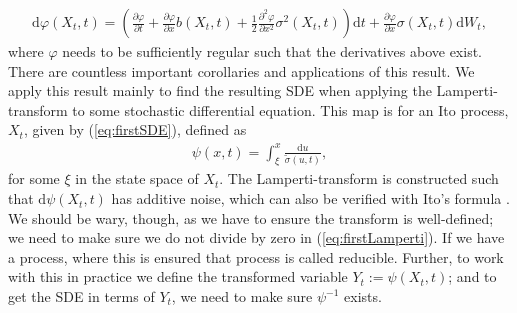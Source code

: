 \begin{align}
    \mathrm{d}\varphi(X_t, t) = \left(\frac{\partial \varphi}{\partial t} + \frac{\partial\varphi}{\partial x}b(X_t, t) + \frac{1}{2} \frac{\partial^2 \varphi}{\partial x^2}\sigma^2(X_t, t) \right)\mathrm{d}t + \frac{\partial\varphi}{\partial x}\sigma(X_t, t) \mathrm{d}W_t, \label{eq:ItoFormula}
\end{align}
where $\varphi$ needs to be sufficiently regular such that the derivatives above exist. 
There are countless important corollaries and applications of this result. We apply this result mainly to find the resulting SDE when applying the Lamperti-transform to some stochastic differential equation. This map is for an Ito process, $X_t$, given by (\ref{eq:firstSDE}), defined as
\begin{align}
    \psi(x, t) = \int_{\xi}^x \frac{\mathrm{d}u}{\tilde{\sigma}(u, t)}, \label{eq:firstLamperti}
\end{align}
for some $\xi$ in the state space of $X_t$. The Lamperti-transform is constructed such that $\mathrm{d}\psi(X_t, t)$ has additive noise, which can also be verified with Ito's formula \cite[equation (7.5)]{Srkk2019}. We should be wary, though, as we have to ensure the transform is well-defined; we need to make sure we do not divide by zero in (\ref{eq:firstLamperti}). If we have a process, where this is ensured that process is called reducible. Further, to work with this in practice we define the transformed variable $Y_t := \psi(X_t, t)$; and to get the SDE in terms of $Y_t$, we need to make sure $\psi^{-1}$ exists.

